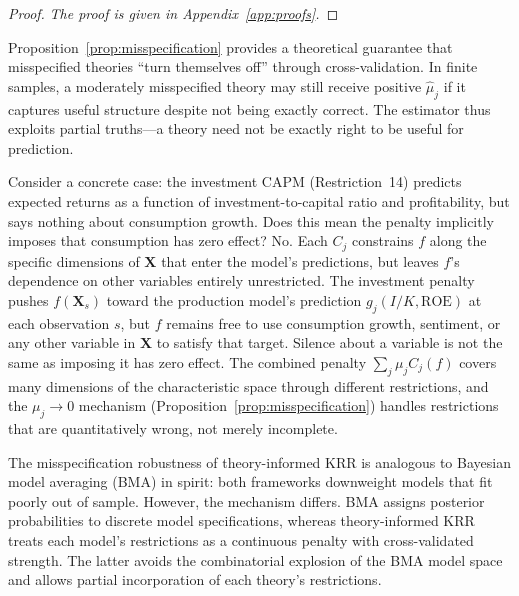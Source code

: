 \begin{proof}
\emph{The proof is given in Appendix~\ref{app:proofs}.}
\end{proof}

\begin{remark}
\label{rem:misspec_practical}
Proposition~\ref{prop:misspecification} provides a theoretical guarantee
that misspecified theories ``turn themselves off'' through cross-validation.
In finite samples, a moderately misspecified theory may still receive
positive $\hat{\mu}_j$ if it captures useful structure despite not
being exactly correct.
The estimator thus exploits partial truths---a theory need not be
exactly right to be useful for prediction.
\end{remark}

\begin{remark}
\label{rem:misspec_variables}
Consider a concrete case: the investment CAPM (Restriction~14) predicts expected
returns as a function of investment-to-capital ratio and profitability, but
says nothing about consumption growth.
Does this mean the penalty implicitly imposes that consumption has zero effect?
No.
Each $C_j$ constrains $f$ along the specific dimensions of $\mathbf{X}$ that
enter the model's predictions, but leaves $f$'s dependence on other variables
entirely unrestricted.
The investment penalty pushes $f(\mathbf{X}_s)$ toward the production model's
prediction $g_j(I/K, \mathrm{ROE})$ at each observation $s$, but $f$ remains
free to use consumption growth, sentiment, or any other variable in $\mathbf{X}$
to satisfy that target.
Silence about a variable is not the same as imposing it has zero effect.
The combined penalty $\sum_j \mu_j C_j(f)$ covers many dimensions of the
characteristic space through different restrictions, and the $\mu_j \to 0$
mechanism (Proposition~\ref{prop:misspecification}) handles restrictions
that are quantitatively wrong, not merely incomplete.
\end{remark}

\begin{remark}
\label{rem:bma}
The misspecification robustness of theory-informed KRR is analogous to
Bayesian model averaging (BMA) in spirit: both frameworks downweight
models that fit poorly out of sample.
However, the mechanism differs.
BMA assigns posterior probabilities to discrete model specifications,
whereas theory-informed KRR treats each model's restrictions as a
continuous penalty with cross-validated strength.
The latter avoids the combinatorial explosion of the BMA model space
and allows partial incorporation of each theory's restrictions.
\end{remark}


